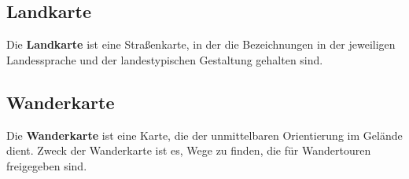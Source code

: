 \documentclass[10pt]{scrreprt}
\begin{document}
\subsection{Landkarte}  
Die \textbf{Landkarte} ist eine Straßenkarte, in der die Bezeichnungen in der jeweiligen Landessprache und der landestypischen Gestaltung gehalten sind.

\vspace{3mm}
\begin{figure}[!htb]
	\centering
    \hspace{5mm}
\end{figure}




\subsection{Wanderkarte}  
Die \textbf{Wanderkarte} ist eine Karte, die der unmittelbaren Orientierung im Gelände dient. Zweck der Wanderkarte ist es, Wege zu finden, die für Wandertouren freigegeben sind.
\end{document}
